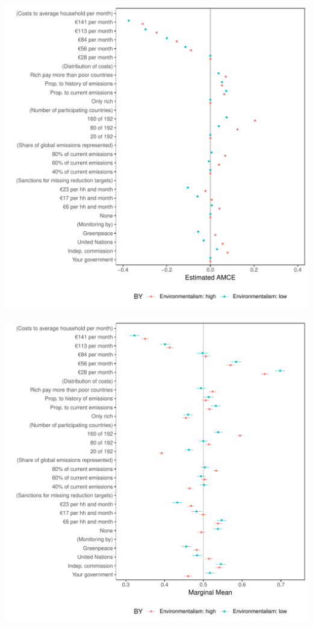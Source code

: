 \documentclass[a4paper,12pt]{article}\usepackage[]{graphicx}\usepackage[]{color}
\makeatletter
\def\maxwidth{ %
  \ifdim\Gin@nat@width>\linewidth
    \linewidth
  \else
    \Gin@nat@width
  \fi
}
\newenvironment{knitrout}{}{} %
\makeatother
\begin{document}
\begin{knitrout}
\color{fgcolor}
\includegraphics[width=\maxwidth]{figure/bechtel_subgroup_amce_environmentalism-1} 

\end{knitrout}

\clearpage

\clearpage

\begin{knitrout}
\color{fgcolor}
\includegraphics[width=\maxwidth]{figure/bechtel_subgroup_mm_environmentalism-1} 

\end{knitrout}
\end{document}
